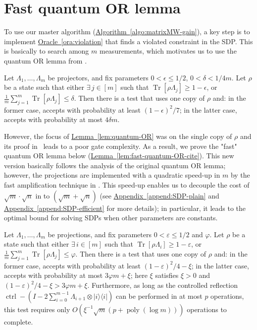 \documentclass[a4paper,UKenglish,cleveref, autoref]{lipics-v2019}
\theoremstyle{remark}
\numberwithin{equation}{section}
\numberwithin{oracle}{section}
\numberwithin{remark}{section}
\newcommand{\ora}[1]{\hyperref[ora:#1]{Oracle~\ref*{ora:#1}}}
\newcommand{\lem}[1]{\hyperref[lem:#1]{Lemma~\ref*{lem:#1}}}
\newcommand{\algo}[1]{\hyperref[algo:#1]{Algorithm~\ref*{algo:#1}}}
\newcommand{\append}[1]{\hyperref[append:#1]{Appendix~\ref*{append:#1}}}
\newcommand{\range}[1]{[#1]}
\newcommand{\ket}[1]{|#1\rangle}
\newcommand{\bra}[1]{\langle#1|}
\newcommand{\proj}[1]{\ket{#1}\bra{#1}}
\DeclareMathOperator{\poly}{poly}
\DeclareMathOperator{\Tr}{Tr}
\begin{document}

\section{Fast quantum OR lemma}\label{append:fast}
To use our master algorithm (\algo{matrixMW-gain}), a key step is to implement \ora{violation} that finds a violated constraint in the SDP. This is basically to search among $m$ measurements, which motivates us to use the quantum OR lemma from \cite{harrow2017sequential}.

\begin{lemma}\label{lem:quantum-OR}
Let $\Lambda_{1},\ldots,\Lambda_{m}$ be projectors, and fix parameters $0<\epsilon\leq 1/2$, $0<\delta<1/4m$. Let $\rho$ be a state such that either $\exists\,j\in\range{m}$ such that $\Tr[\rho\Lambda_{j}]\geq 1-\epsilon$, or $\frac{1}{m}\sum_{j=1}^{m}\Tr[\rho\Lambda_{j}]\leq\delta$. Then there is a test that uses one copy of $\rho$ and: in the former case, accepts with probability at least $(1-\epsilon)^{2}/7$; in the latter case, accepts with probability at most $4\delta m$.
\end{lemma}
\noindent
However, the focus of \lem{quantum-OR} was on the single copy of $\rho$ and its proof in~\cite{harrow2017sequential} leads to a poor gate complexity.  As a result, we prove the "fast" quantum OR lemma below (\lem{fast-quantum-OR-cite}). This new version basically follows the analysis of the original quantum OR lemma; however, the projections are implemented with a quadratic speed-up in $m$ by the fast amplification technique in \cite{nagaj2009fast}. This speed-up enables us to decouple the cost of $\sqrt{m}\cdot\sqrt{n}$ in \cite{brandao2016quantum,vanApeldoorn2017quantum} to $(\sqrt{m}+\sqrt{n})$ (see \append{SDP-plain} and \append{SDP-efficient} for more details); in particular, it leads to the optimal bound for solving SDPs when other parameters are constants.

\begin{lemma}\label{lem:fast-quantum-OR-cite}
Let $\Lambda_{1},\ldots,\Lambda_{m}$ be projections, and fix parameters $0<\varepsilon\leq 1/2$ and $\varphi$. Let $\rho$ be a state such that either $\exists\,i\in\range{m}$ such that $\Tr[\rho\Lambda_{i}]\geq 1-\varepsilon$, or $\frac{1}{m}\sum_{j=1}^{m}\Tr[\rho\Lambda_{j}]\leq\varphi$. Then there is a test that uses one copy of $\rho$ and: in the former case, accepts with probability at least $(1-\varepsilon)^{2}/4 - \xi$; in the latter case, accepts with probability at most $3\varphi m + \xi$; here $\xi$ satisfies $\xi>0$ and $(1-\varepsilon)^{2}/4 - \xi>3\varphi m + \xi$. Furthermore, as long as the controlled reflection $\operatorname{ctrl}-(I-2\sum_{i = 0}^{m-1}\Lambda_{i+1}\otimes\proj{i})$ can be performed in at most $p$ operations, this test requires only $O(\xi^{-1}\sqrt{m}(p+\poly(\log m)))$ operations to complete.
\end{lemma}
\end{document}
